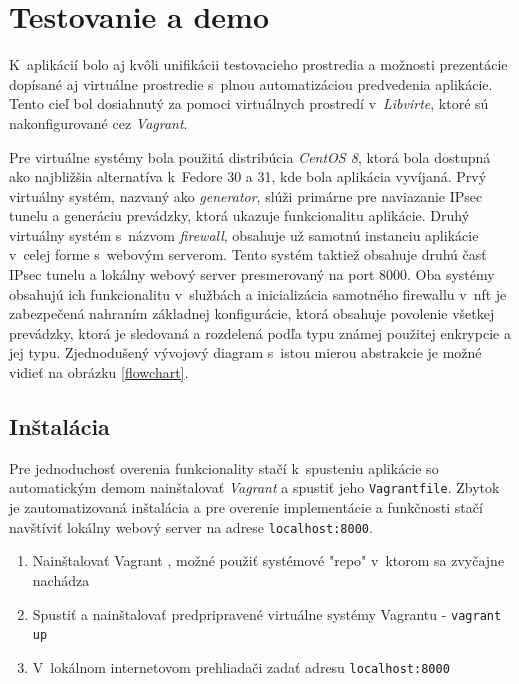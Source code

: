 \section{Testovanie a demo}
K~aplikácií bolo aj kvôli unifikácii testovacieho prostredia a možnosti prezentácie dopísané aj virtuálne prostredie s~plnou automatizáciou predvedenia aplikácie.
Tento cieľ bol dosiahnutý za pomoci virtuálnych prostredí v~\emph{Libvirte}, ktoré sú nakonfigurované cez \emph{Vagrant}. 

Pre virtuálne systémy bola použitá distribúcia \emph{CentOS 8}, ktorá bola dostupná ako najbližšia alternatíva k~Fedore 30 a 31, kde bola aplikácia vyvíjaná. Prvý virtuálny systém, nazvaný ako \emph{generator}, slúži primárne pre naviazanie IPsec tunelu a generáciu prevádzky, ktorá ukazuje funkcionalitu aplikácie. Druhý virtuálny systém s~názvom \emph{firewall}, obsahuje už samotnú instanciu aplikácie v~celej forme s~webovým serverom. Tento systém taktiež obsahuje druhú časť IPsec tunelu a lokálny webový server presmerovaný na port 8000. Oba systémy obsahujú ich funkcionalitu v~službách a inicializácia samotného firewallu v~nft je zabezpečená nahraním základnej konfigurácie, ktorá obsahuje povolenie všetkej prevádzky, ktorá je sledovaná a rozdelená podľa typu známej použitej enkrypcie a jej typu. Zjednodušený vývojový diagram s~istou mierou abstrakcie je možné vidieť na obrázku \ref{flowchart}.

\subsection{Inštalácia}
Pre jednoduchosť overenia funkcionality stačí k~spusteniu aplikácie so automatickým demom nainštalovať \emph{Vagrant} a spustiť jeho \texttt{Vagrantfile}. Zbytok je zautomatizovaná inštalácia a pre overenie implementácie a funkčnosti stačí navštíviť lokálny webový server na adrese \texttt{localhost:8000}.

\begin{enumerate}
	\item Nainštalovať Vagrant \cite{vagrant}, možné použiť systémové "repo" v~ktorom sa zvyčajne nachádza
	\item Spustiť a nainštalovať predpripravené virtuálne systémy Vagrantu - \texttt{vagrant up}
	\item V~lokálnom internetovom prehliadači zadať adresu \texttt{localhost:8000}
\end{enumerate}
                                                                                                                                               
